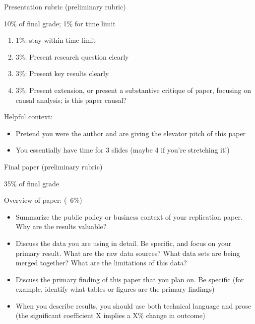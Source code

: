 \documentclass[compress, 8pt]{beamer}
\begin{document}
\begin{frame}{Presentation rubric (preliminary rubric)}

10\% of final grade; 1\% for time limit
\begin{enumerate}
    \item 1\%: stay within time limit
    \item 3\%: Present research question clearly
    \item 3\%: Present key results clearly
    \item 3\%: Present extension, or present a substantive critique of paper, focusing on causal analysis; is this paper causal? 
\end{enumerate}
Helpful context: 
\begin{itemize}
    \item Pretend you were the author and are giving the elevator pitch of this paper
    \item You essentially have time for 3 slides (maybe 4 if you're stretching it!)
\end{itemize}

\end{frame}

\begin{frame}{Final paper (preliminary rubric)}

35\% of final grade
\vspace{3ex}

Overview of paper: (~6\%)
\begin{itemize}
    \item Summarize the public policy or business context of your replication paper. Why are the results valuable?
    \item Discuss the data you are using in detail. Be specific, and focus on your primary result. What are the raw data sources? What data sets are being merged together? What are the limitations of this data?
    \item Discuss the primary finding of this paper that you plan on. Be specific (for example, identify what tables or figures are the primary findings)
    \item When you describe results, you should use both technical language and prose (the significant coefficient X implies a X\% change in outcome)
\end{itemize}


\end{frame} 
\end{document}

